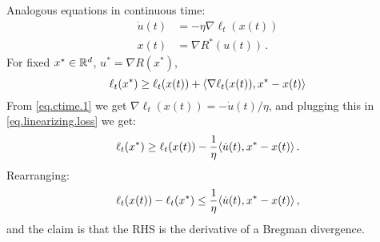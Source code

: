 \documentclass[12pt]{article}
\theoremstyle{plain}
\theoremstyle{definition}
\theoremstyle{remark}
\begin{document}
Analogous equations in continuous time:
\begin{align*}
\dot{u}(t) &= - \eta \nabla \ell_{t}(x(t)) \label{eq.ctime.1} \tag{1ct} \\
x(t) &= \nabla R^{*}(u(t))\,. \label{eq.ctime.2} \tag{2ct}
\end{align*}
For fixed $x^{*} \in \mathbb{R}^d$, $u^{*} = \nabla R(x^{*})$,
\setcounter{equation}{3}
\begin{equation}
\ell_{t}(x^{*}) \geq \ell_{t}(x(t)) + \langle {\nabla\ell_t(x(t)), x^{*} - x(t)}\rangle \label{eq.linearizing.loss}
\end{equation}
From \eqref{eq.ctime.1} we get $\nabla \ell_{t}(x(t)) = -\dot{u}(t)/\eta$,
and plugging this in \eqref{eq.linearizing.loss} we get:
\[
\ell_{t}(x^{*}) \geq \ell_{t}(x(t)) - \frac{1}{\eta} \langle {\dot{u}(t), x^{*} - x(t)}\rangle\,.
\]
Rearranging:
\begin{equation}
\ell_{t}(x(t)) - \ell_{t}(x^{*}) \leq  \frac{1}{\eta} \langle {\dot{u}(t), x^{*} - x(t)}\rangle\,, \label{eq.loss.prep}
\end{equation}
and the claim is that the RHS is the derivative of a Bregman divergence.

\bigskip
\end{document}
